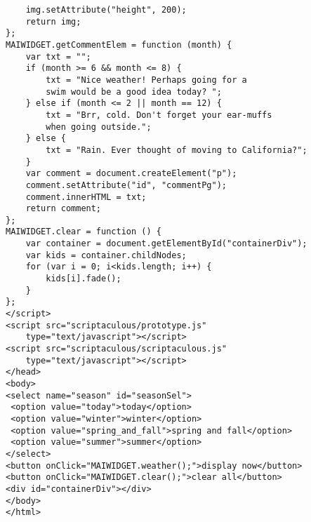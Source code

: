 \documentclass[a4paper,10pt]{article}
\begin{document}
\begin{verbatim}
    img.setAttribute("height", 200);
    return img;
};
MAIWIDGET.getCommentElem = function (month) {
    var txt = "";
    if (month >= 6 && month <= 8) {
        txt = "Nice weather! Perhaps going for a 
        swim would be a good idea today? ";
    } else if (month <= 2 || month == 12) {
        txt = "Brr, cold. Don't forget your ear-muffs 
        when going outside.";
    } else {
        txt = "Rain. Ever thought of moving to California?";
    }
    var comment = document.createElement("p");
    comment.setAttribute("id", "commentPg");
    comment.innerHTML = txt; 
    return comment;
};
MAIWIDGET.clear = function () {
    var container = document.getElementById("containerDiv");
    var kids = container.childNodes;
    for (var i = 0; i<kids.length; i++) {
        kids[i].fade();
    }
};
</script>
<script src="scriptaculous/prototype.js" 
    type="text/javascript"></script>
<script src="scriptaculous/scriptaculous.js" 
    type="text/javascript"></script>
</head>
<body>
<select name="season" id="seasonSel">
 <option value="today">today</option>
 <option value="winter">winter</option>
 <option value="spring_and_fall">spring and fall</option>
 <option value="summer">summer</option>
</select>
<button onClick="MAIWIDGET.weather();">display now</button>
<button onClick="MAIWIDGET.clear();">clear all</button>
<div id="containerDiv"></div>
</body>
</html>
\end{verbatim}
\end{document}
